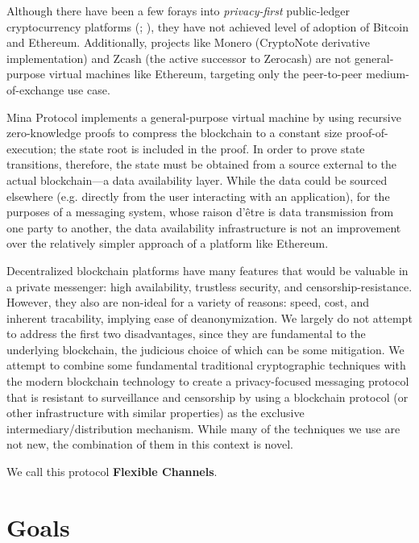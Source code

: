 Although there have been a few forays into \emph{privacy-first} public-ledger cryptocurrency platforms (\cite[CryptoNote:][]{saberhagen_cryptonote_2013}; \cite[Zerocash:][]{sasson_zerocash_2014}), they have not achieved level of adoption of Bitcoin and Ethereum. Additionally, projects like Monero (CryptoNote derivative implementation) and Zcash (the active successor to Zerocash) are not general-purpose virtual machines like Ethereum, targeting only the peer-to-peer medium-of-exchange use case.

Mina Protocol implements a general-purpose virtual machine by using recursive zero-knowledge proofs to compress the blockchain to a constant size proof-of-execution; the state root is included in the proof. \parencite{bonneau_mina_2020} In order to prove state transitions, therefore, the state must be obtained from a source external to the actual blockchain---a data availability layer. While the data could be sourced elsewhere (e.g. directly from the user interacting with an application), for the purposes of a messaging system, whose raison d'\^{e}tre is data transmission from one party to another, the data availability infrastructure is not an improvement over the relatively simpler approach of a platform like Ethereum.

\bigskip

Decentralized blockchain platforms have many features that would be valuable in a private messenger: high availability, trustless security, and censorship-resistance. However, they also are non-ideal for a variety of reasons: speed, cost, and inherent tracability, implying ease of deanonymization. We largely do not attempt to address the first two disadvantages, since they are fundamental to the underlying blockchain, the judicious choice of which can be some mitigation. We attempt to combine some fundamental traditional cryptographic techniques with the modern blockchain technology to create a privacy-focused messaging protocol that is resistant to surveillance and censorship by using a blockchain protocol (or other infrastructure with similar properties) as the exclusive intermediary/distribution mechanism. While many of the techniques we use are not new, the combination of them in this context is novel.

We call this protocol \textbf{Flexible Channels}.

\section{Goals}\label{goals}


